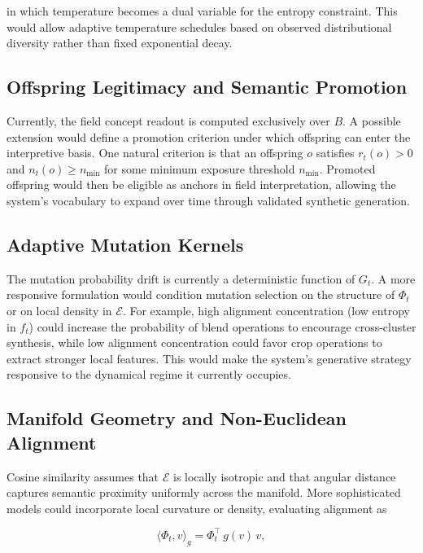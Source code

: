 \documentclass[12pt, a4paper]{article}
\theoremstyle{definition}
\begin{document}
in which temperature becomes a dual variable for the entropy constraint. This would allow adaptive temperature schedules based on observed distributional diversity rather than fixed exponential decay.

\subsection{Offspring Legitimacy and Semantic Promotion}

Currently, the field concept readout is computed exclusively over $B$. A possible extension would define a promotion criterion under which offspring can enter the interpretive basis. One natural criterion is that an offspring $o$ satisfies $r_t(o) > 0$ and $n_t(o) \ge n_{\min}$ for some minimum exposure threshold $n_{\min}$. Promoted offspring would then be eligible as anchors in field interpretation, allowing the system's vocabulary to expand over time through validated synthetic generation.

\subsection{Adaptive Mutation Kernels}

The mutation probability drift is currently a deterministic function of $G_t$. A more responsive formulation would condition mutation selection on the structure of $\Phi_t$ or on local density in $\mathcal{E}$. For example, high alignment concentration (low entropy in $f_t$) could increase the probability of blend operations to encourage cross-cluster synthesis, while low alignment concentration could favor crop operations to extract stronger local features. This would make the system's generative strategy responsive to the dynamical regime it currently occupies.

\subsection{Manifold Geometry and Non-Euclidean Alignment}

Cosine similarity assumes that $\mathcal{E}$ is locally isotropic and that angular distance captures semantic proximity uniformly across the manifold. More sophisticated models could incorporate local curvature or density, evaluating alignment as

\begin{equation}
\langle \Phi_t, v \rangle_g = \Phi_t^\top\, g(v)\, v,
\end{equation}
\end{document}
